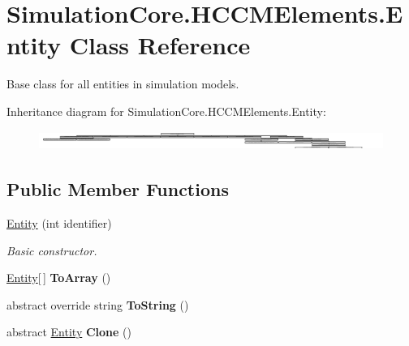 \hypertarget{class_simulation_core_1_1_h_c_c_m_elements_1_1_entity}{}\section{Simulation\+Core.\+H\+C\+C\+M\+Elements.\+Entity Class Reference}
\label{class_simulation_core_1_1_h_c_c_m_elements_1_1_entity}


Base class for all entities in simulation models.  


Inheritance diagram for Simulation\+Core.\+H\+C\+C\+M\+Elements.\+Entity\+:\begin{figure}[H]
\begin{center}
\leavevmode
\includegraphics[height=0.625698cm]{class_simulation_core_1_1_h_c_c_m_elements_1_1_entity}
\end{center}
\end{figure}
\subsection*{Public Member Functions}
\begin{DoxyCompactItemize}
\item 
\hyperlink{class_simulation_core_1_1_h_c_c_m_elements_1_1_entity_a88853a3d3acea2bc9e6ad9fe2921c154}{Entity} (int identifier)
\begin{DoxyCompactList}\small\item\em Basic constructor. \end{DoxyCompactList}\item 
\hyperlink{class_simulation_core_1_1_h_c_c_m_elements_1_1_entity}{Entity}\mbox{[}$\,$\mbox{]} {\bfseries To\+Array} ()\hypertarget{class_simulation_core_1_1_h_c_c_m_elements_1_1_entity_a3ad1cfa0b6bc2cef76f627c00cdb951a}{}\label{class_simulation_core_1_1_h_c_c_m_elements_1_1_entity_a3ad1cfa0b6bc2cef76f627c00cdb951a}

\item 
abstract override string {\bfseries To\+String} ()\hypertarget{class_simulation_core_1_1_h_c_c_m_elements_1_1_entity_a0f1ef38de8a057a7bff5361f8779cd47}{}\label{class_simulation_core_1_1_h_c_c_m_elements_1_1_entity_a0f1ef38de8a057a7bff5361f8779cd47}

\item 
abstract \hyperlink{class_simulation_core_1_1_h_c_c_m_elements_1_1_entity}{Entity} {\bfseries Clone} ()\hypertarget{class_simulation_core_1_1_h_c_c_m_elements_1_1_entity_a4c99612e06b03a2a0d1a1139a05c455b}{}\label{class_simulation_core_1_1_h_c_c_m_elements_1_1_entity_a4c99612e06b03a2a0d1a1139a05c455b}

\end{DoxyCompactItemize}
